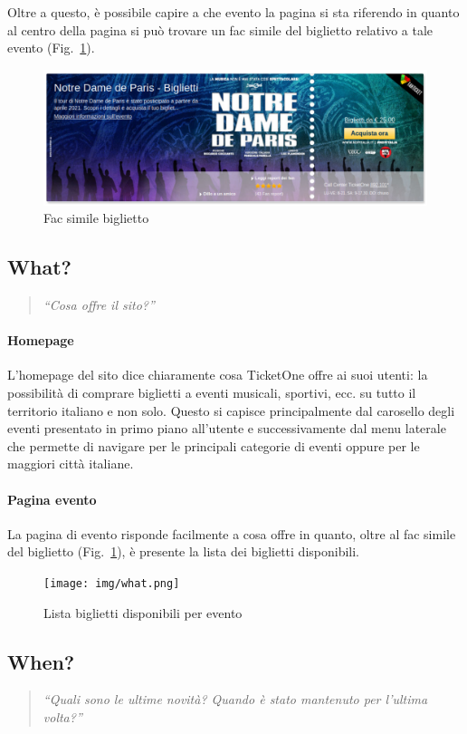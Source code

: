 		Oltre a questo, è possibile capire a che evento la pagina si sta riferendo in quanto al centro della pagina si può trovare un fac simile del biglietto relativo a tale evento (Fig.~\ref{where2}).
		\begin{figure}[hbt]
			\centering
			\includegraphics[width=\textwidth]{img/where2.png}
			\caption{Fac simile biglietto}
			\label{where2}
		\end{figure}
	
\subsection{What?}
	\begin{quote}
		\emph{``Cosa offre il sito?''}
	\end{quote}
	\paragraph{Homepage}
		L'homepage del sito dice chiaramente cosa TicketOne offre ai suoi utenti: la possibilità di comprare biglietti a eventi musicali, sportivi, ecc. su tutto il territorio italiano e non solo.
		Questo si capisce principalmente dal carosello degli eventi presentato in primo piano all'utente e successivamente dal menu laterale che permette di navigare per le principali categorie di eventi oppure per le maggiori città italiane.
		
	\paragraph{Pagina evento}
		La pagina di evento risponde facilmente a cosa offre in quanto, oltre al fac simile del biglietto (Fig.~\ref{where2}), è presente la lista dei biglietti disponibili.
		\begin{figure}[hbt]
			\centering
			\texttt{[image: img/what.png]}
			\caption{Lista biglietti disponibili per evento}
			\label{what}
		\end{figure}
	
\subsection{When?}
	\begin{quote}
		\emph{``Quali sono le ultime novità? Quando è stato mantenuto per l'ultima volta?''}
	\end{quote}
